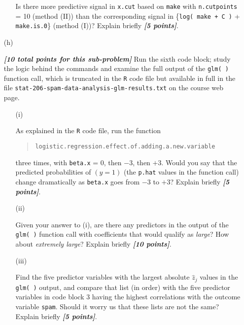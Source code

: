 \documentclass[12pt]{article}
\newcommand{\bi}[1]{\textbf{\textit{#1}}}
\begin{document}
\begin{itemize}
\begin{itemize}
Is there more predictive signal in \texttt{x.cut} based on \texttt{make} with \texttt{n.cutpoints} = 10 (method (II)) than the corresponding signal in \{\texttt{log( make + C )} + \texttt{make.is.0}\} (method (I))? Explain briefly \bi{[5 points]}.

\end{itemize}

\item[(h)]

\bi{[10 total points for this sub-problem]} Run the sixth code block; study the logic behind the commands and examine the full output of the \texttt{glm( )} function call, which is truncated in the \texttt{R} code file but available in full in the file \texttt{stat-206-spam-data-analysis-glm-results.txt} on the course web page. 

\begin{itemize}

\item[(i)]

As explained in the \texttt{R} code file, run the function 

\begin{quote}

\texttt{logistic.regression.effect.of.adding.a.new.variable} 

\end{quote}

three times, with \texttt{beta.x} = $0$, then $-3$, then $+3$. Would you say that the predicted probabilities of $( y = 1 )$ (the \texttt{p.hat} values in the function call) change dramatically as \texttt{beta.x} goes from $-3$ to $+3$? Explain briefly \bi{[5 points]}. 

\item[(ii)]

Given your answer to (i), are there any predictors in the output of the \texttt{glm( )} function call with coefficients that would qualify as \textit{large}? How about \textit{extremely large}? Explain briefly \bi{[10 points]}.

\item[(iii)]

Find the five predictor variables with the largest absolute $\hat{ z }_j$ values in the \texttt{glm( )} output, and compare that list (in order) with the five predictor variables in code block 3 having the highest correlations with the outcome variable \texttt{spam}. Should it worry us that these lists are not the same? Explain briefly \bi{[5 points]}.  

\end{itemize}


\end{itemize}
\end{document}
